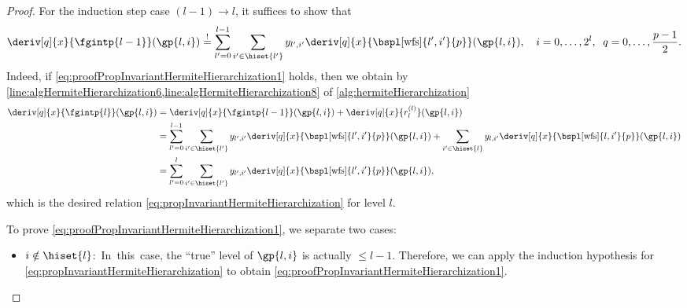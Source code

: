 \begin{proof}
  For the induction step case $(l-1) \to l$,
  it suffices to show that
  \begin{equation}
    \label{eq:proofPropInvariantHermiteHierarchization1}
    \deriv[q]{x}{\fgintp{l-1}}(\gp{l,i})
    \overset{!}{=} \sum_{l'=0}^{l-1} \sum_{i' \in \hiset{l'}}
    \linout{l',i'} \deriv[q]{x}{\bspl[\wfs]{l',i'}{p}}(\gp{l,i}),\quad
    i = 0, \dotsc, 2^l,\;\;
    q = 0, \dotsc, \frac{p-1}{2}.
  \end{equation}
  Indeed, if \eqref{eq:proofPropInvariantHermiteHierarchization1} holds,
  then we obtain by
  \cref{line:algHermiteHierarchization6,line:algHermiteHierarchization8}
  of \cref{alg:hermiteHierarchization}
  \begin{subequations}
    \begin{align}
      \deriv[q]{x}{\fgintp{l}}(\gp{l,i})
      &= \deriv[q]{x}{\fgintp{l-1}}(\gp{l,i}) +
      \deriv[q]{x}{r^{(l)}_l}(\gp{l,i})\\
      &= \sum_{l'=0}^{l-1} \sum_{i' \in \hiset{l'}}
      \linout{l',i'} \deriv[q]{x}{\bspl[\wfs]{l',i'}{p}}(\gp{l,i}) +
      \sum_{i' \in \hiset{l}}
      \linout{l,i'} \deriv[q]{x}{\bspl[\wfs]{l,i'}{p}}(\gp{l,i})\\
      &= \sum_{l'=0}^l \sum_{i' \in \hiset{l'}}
      \linout{l',i'} \deriv[q]{x}{\bspl[\wfs]{l',i'}{p}}(\gp{l,i}),
    \end{align}
  \end{subequations}
  which is the desired relation
  \eqref{eq:propInvariantHermiteHierarchization}
  for level $l$.
  
  To prove \eqref{eq:proofPropInvariantHermiteHierarchization1},
  we separate two cases:
  \begin{itemize}
    \item
    \mbox{${i \notin \hiset{l}}$: In this case,}
    the ``true'' level of $\gp{l,i}$ is actually $\le l - 1$.
    Therefore, we can apply the induction hypothesis
    for \cref{eq:propInvariantHermiteHierarchization} to
    obtain \eqref{eq:proofPropInvariantHermiteHierarchization1}.
    

\end{itemize}
\end{proof}
